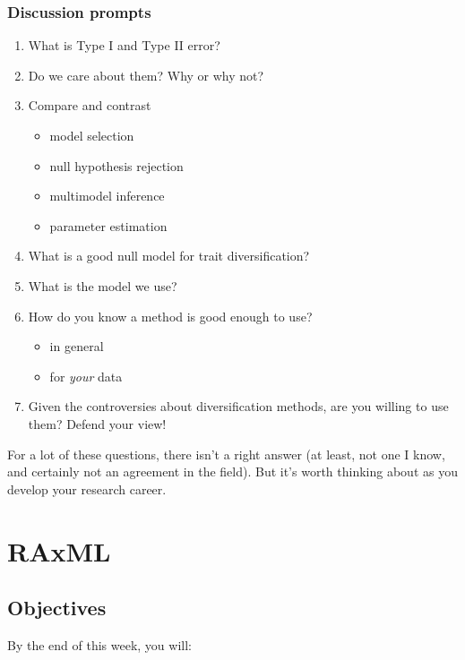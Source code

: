 \documentclass[]{book}
\providecommand{\tightlist}{%
  \setlength{\itemsep}{0pt}\setlength{\parskip}{0pt}}
\theoremstyle{definition}
\theoremstyle{definition}
\theoremstyle{remark}
\begin{document}
\subsection{Discussion prompts}\label{discussion-prompts}

\begin{enumerate}
\def\labelenumi{\arabic{enumi}.}
\tightlist
\item
  What is Type I and Type II error?
\item
  Do we care about them? Why or why not?
\item
  Compare and contrast

  \begin{itemize}
  \tightlist
  \item
    model selection
  \item
    null hypothesis rejection
  \item
    multimodel inference
  \item
    parameter estimation
  \end{itemize}
\item
  What is a good null model for trait diversification?
\item
  What is the model we use?
\item
  How do you know a method is good enough to use?

  \begin{itemize}
  \tightlist
  \item
    in general
  \item
    for \emph{your} data
  \end{itemize}
\item
  Given the controversies about diversification methods, are you willing
  to use them? Defend your view!
\end{enumerate}

For a lot of these questions, there isn't a right answer (at least, not
one I know, and certainly not an agreement in the field). But it's worth
thinking about as you develop your research career.

\chapter{RAxML}\label{raxml}

\section{Objectives}\label{objectives-5}

By the end of this week, you will:
\end{document}
